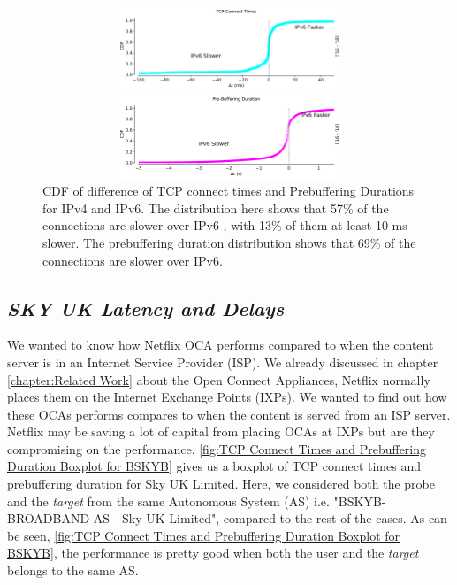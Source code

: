 \begin{figure}
	\begin{minipage}{0.6\linewidth}
		\includegraphics[keepaspectratio, height=2.5cm, width=15cm]{figures/tcp/netflix-syn-time-absolute-difference.pdf}
	\end{minipage}
	\begin{minipage}{0.6\linewidth}
		\includegraphics[keepaspectratio, height=2.5cm, width=15cm]{figures/tcp/netflix-prebuffering-duration-absolute-difference.pdf}
	\end{minipage}
\caption[TCP connect times and Prebuffering Duration CDF]{CDF of difference of TCP connect times and Prebuffering Durations for IPv4 and IPv6. The distribution here shows that 57\% of the connections are slower over IPv6 , with 13\% of them at least 
10 ms slower. The prebuffering duration distribution shows that 69\% of the connections are slower over IPv6.}
\label{fig:TCP connect times and Prebuffering Duration CDF}
\end{figure} 

\subsection*{\textit{SKY UK Latency and Delays}}

We wanted to know how Netflix OCA performs compared to when the content server is in an Internet Service Provider (ISP). We already discussed in chapter \ref{chapter:Related Work} about the Open Connect Appliances, Netflix normally places them 
on the Internet Exchange Points (IXPs). We wanted to find out how these OCAs performs compares to when the content is served from an ISP server. Netflix may be saving a lot of capital from placing OCAs at IXPs but are they compromising on the performance.
\cref{fig:TCP Connect Times and Prebuffering Duration Boxplot for BSKYB} gives us a boxplot of TCP connect times and prebuffering duration for Sky UK Limited.
Here, we considered both the probe and the \textit{target} from the same Autonomous System (AS) i.e. "BSKYB-BROADBAND-AS - Sky UK Limited", compared to the rest of the cases.
As can be seen, \cref{fig:TCP Connect Times and Prebuffering Duration Boxplot for BSKYB}, the performance is pretty good when both the user and the \textit{target} belongs to the same AS.

